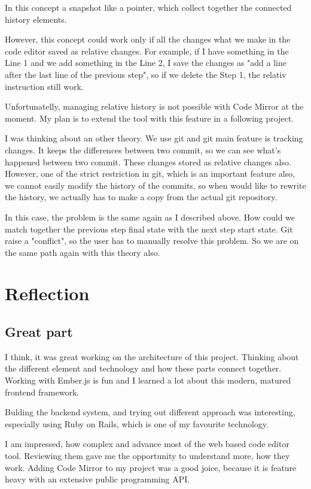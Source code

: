 \documentclass[12pt, a4paper, oneside, openright, medskipamount]{report}
\begin{document}
In this concept a snapshot like a pointer, which collect together the connected history elements.

However, this concept could work only if all the changes what we make in the code editor saved as relative changes. For example, if I have something in the Line 1 and we add something in the Line 2, I save the changes as "add a line after the last line of the previous step", so if we delete the Step 1, the relativ instruction still work.

Unfortunatelly, managing relative history is not possible with Code Mirror at the moment. My plan is to extend the tool with this feature in a following project.

I was thinking about an other theory. We use git and git main feature is tracking changes. It keeps the differences between two commit, so we can see what's happened between two commit. These changes stored as relative changes also. However, one of the strict restriction in git, which is an important feature also, we cannot easily modify the history of the commits, so when would like to rewrite the history, we actually has to make a copy from the actual git repository.

In this case, the problem is the same again as I described above. How could we match together the previous step final state with the next step start state. Git raise a "conflict", so the user has to manually resolve this problem. So we are on the same path again with this theory also.

\section{Reflection}

\subsection{Great part}

I think, it was great working on the architecture of this project. Thinking about the different element and technology and how these parts connect together. Working with Ember.js is fun and I learned a lot about this modern, matured frontend framework.

Bulding the backend system, and trying out different approach was interesting, especially using Ruby on Rails, which is one of my favourite technology.

I am impressed, how complex and advance most of the web based code editor tool. Reviewing them gave me the opportunity to understand more, how they work. Adding Code Mirror to my project was a good joice, because it is feature heavy with an extensive public programming API.
\end{document}
